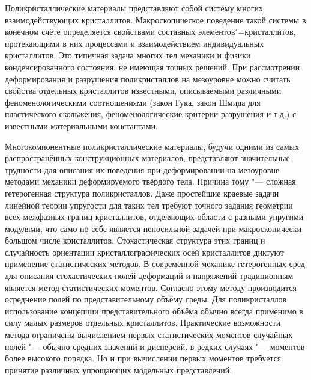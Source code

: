 \maketitle


 Поликристаллические материалы представляют
собой систему многих взаимодействующих кристаллитов.
Макроскопическое поведение такой системы в конечном счёте
определяется свойствами составных элементов"=кристаллитов,
протекающими в них процессами и взаимодействием индивидуальных
кристаллитов. Это типичная задача многих тел механики и физики
конденсированного состояния, не имеющая точных решений. При
рассмотрении деформирования и разрушения поликристаллов на
мезоуровне можно считать свойства отдельных кристаллитов
известными, описываемыми различными феноменологическими
соотношениями (закон Гука, закон Шмида для пластического
скольжения, феноменологические критерии разрушения и т.д.) с
известными материальными константами.

Многокомпонентные поликристаллические материалы, будучи одними из
самых распространённых конструкционных материалов, представляют
значительные трудности для описания их поведения при
деформировании на мезоуровне методами механики деформируемого
твёрдого тела. Причина тому "--- сложная гетерогенная структура
поликристаллов. Даже простейшие краевые задачи линейной теории
упругости для таких тел требуют точного задания геометрии всех
межфазных границ кристаллитов, отделяющих области с разными
упругими модулями, что само по себе является непосильной задачей
при макроскопически большом числе кристаллитов. Стохастическая
структура этих границ и случайность ориентации
кристаллографических осей кристаллитов диктуют применение
статистических методов. В современной механике гетерогенных сред
для описания стохастических полей деформаций и напряжений
традиционным является метод статистических моментов. Согласно
этому методу производится осреднение полей по представительному
объёму среды. Для поликристаллов использование концепции
представительного объёма обычно всегда применимо в силу малых
размеров отдельных кристаллитов. Практические возможности метода
ограничены вычислением первых статистических моментов случайных
полей "--- обычно средних значений и дисперсий, в редких случаях "---
моментов более высокого порядка. Но и при вычислении первых
моментов требуется принятие различных упрощающих модельных
представлений.


